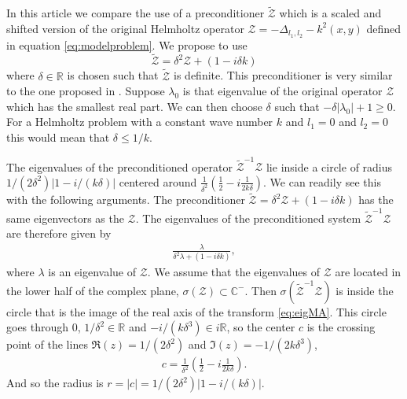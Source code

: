 \documentclass[mathpazo]{cicp}
\theoremstyle{definition}
\numberwithin{equation}{section}
\providecommand{\wv}{}
\begin{document}
In this article we compare the use of a preconditioner $\tilde{\mathcal{Z}}$ which is a scaled 
and shifted version of the original Helmholtz operator $\mathcal{Z} \wv{ = -\Delta_{l_1,l_2}-k^2(x,y)}$ defined in equation \eqref{eq:modelproblem}.
We propose to use
\begin{equation}
\tilde{ \mathcal{Z}} = \delta^2 \mathcal{Z}  + (1-i\delta k)
  \label{eq:preconditioner_operator}
\end{equation}
where $\delta \in \mathbb{R}$ is chosen such that $\tilde{\mathcal{Z}}$ is definite. This preconditioner is very similar to the
one proposed in \cite{meerbergen2009}.
 Suppose $\lambda_0$ is that eigenvalue of the original operator $\mathcal{Z}$ which has the smallest real part.
We can then choose $\delta$ such that $-\delta |\lambda_0| + 1 \ge 0$.  For a Helmholtz problem with a constant wave number $k$
\wv{and $l_1=0$ and $l_2=0$} this would mean that $\delta \le 1/k$.






The eigenvalues of the preconditioned operator \wv{$\tilde{\mathcal{Z}}^{-1} \mathcal{Z}$} lie inside a circle of radius
$1/(2\delta^2)\left|1-i/(k\delta)\right|$ centered around
$\frac{1}{\delta^2}\left(\frac{1}{2}-i\frac{1}{2k\delta}\right)$.  We
can readily see this with the following arguments. The preconditioner
$\tilde{\mathcal{Z}}=\delta^2\mathcal{Z}+(1-i\delta k)$ has the same
eigenvectors as the $\mathcal{Z}$. The eigenvalues of the
preconditioned system \wv{$\tilde{\mathcal{Z}}^{-1}\mathcal{Z}$} are therefore given by
\begin{align}\label{eq:eigMA}
\frac{\lambda}{\delta^2\lambda+(1-i\delta k)}, 
\end{align}
where $\lambda$ is an eigenvalue of \wv{$\mathcal{Z}$}. We assume that
the eigenvalues of $\mathcal{Z}$ are located in the lower half of the complex
plane, $\sigma(\mathcal{Z})\subset\mathbb{C}^-$. Then $\sigma(\tilde{\mathcal{Z}}^{-1}\mathcal{Z})$ is
inside the circle that is the image of the real axis of the transform
\eqref{eq:eigMA}. This circle goes through $0$,
$1/\delta^2\in\mathbb{R}$ and $-i/(k\delta^3)\in i\mathbb{R}$, so the
center $c$ is the crossing point of the lines $\Re(z)=1/(2\delta^2)$
and $\Im(z)=-1/(2k\delta^3)$,
\begin{align*}
c = \frac{1}{\delta^2}\left(\frac{1}{2}-i\frac{1}{2k\delta}\right).
\end{align*}
And so the radius is $r=|c|= 1/(2\delta^2)\left|1-i/(k\delta)\right|$.
\end{document}
